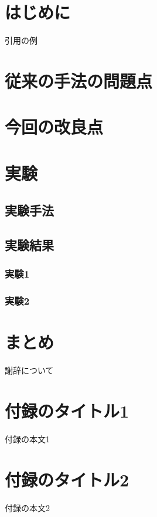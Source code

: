 \documentclass[Specialissue]{jsaiart}
\author{%
 \name{著者1姓}{名}{Auther1 Roman Name}
 \affiliation{日本語所属名1}%
     {職種 in English e.g.) Engineer}%
     {user1@cyberagent.co.jp, http://cyberagent.co.jp/~user1/}
\and
 \name{著者2姓}{名}{Auther2 Roman Name}
 \affiliation{日本語所属名2}%
     {職種 in English e.g.) Researcher}%
     {user2@cyberagent.co.jp, http://cyberagent.co.jp/~user2/}
}
\begin{document}
\maketitle

\section{はじめに}
引用の例\cite{latex,texbook}
\section{従来の手法の問題点}
\section{今回の改良点}
\section{実験}
\subsection{実験手法}
\subsection{実験結果}
\subsubsection{実験1}
\subsubsection{実験2}
\section{まとめ}

\newpage
\begin{acknowledgment}
謝辞について
\end{acknowledgment}




\newpage
\appendix
\section{付録のタイトル1}
付録の本文1
\section{付録のタイトル2}
付録の本文2

\begin{biography}
\end{biography}
\end{document}
